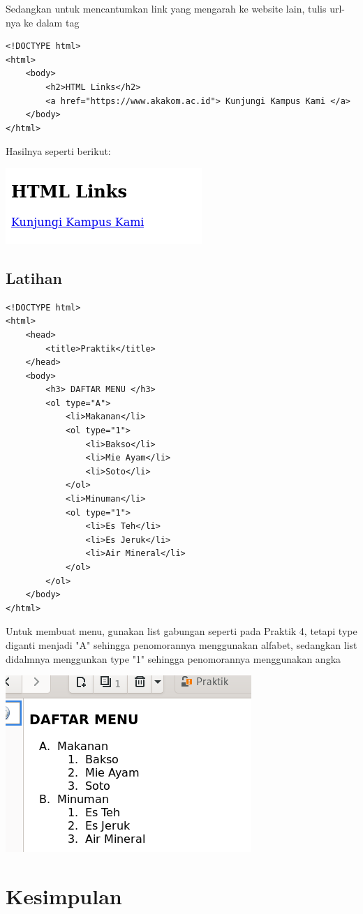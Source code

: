 \documentclass[a4paper,12pt]{article}
\begin{document}
Sedangkan untuk mencantumkan link yang mengarah ke website lain, tulis url-nya ke dalam tag
\begin{lstlisting}
<!DOCTYPE html>
<html>
    <body>
        <h2>HTML Links</h2>
        <a href="https://www.akakom.ac.id"> Kunjungi Kampus Kami </a>
    </body>
</html>
\end{lstlisting}
Hasilnya seperti berikut:
\begin{center}
    \includegraphics[width=\linewidth]{7.png}
\end{center}

\subsection{Latihan}
\begin{lstlisting}
<!DOCTYPE html>
<html>
    <head>
        <title>Praktik</title>
    </head>
    <body>
        <h3> DAFTAR MENU </h3>
        <ol type="A">
            <li>Makanan</li>
            <ol type="1">
                <li>Bakso</li>
                <li>Mie Ayam</li>
                <li>Soto</li>
            </ol>
            <li>Minuman</li>
            <ol type="1">
                <li>Es Teh</li>
                <li>Es Jeruk</li>
                <li>Air Mineral</li>
            </ol>
        </ol>
    </body>
</html>
\end{lstlisting}
Untuk membuat menu, gunakan list gabungan seperti pada Praktik 4, tetapi type diganti menjadi "A" sehingga penomorannya menggunakan alfabet, sedangkan list didalmnya menggunkan 
type "1" sehingga penomorannya menggunakan angka
\begin{center}
    \includegraphics[width=\linewidth]{8.png}
\end{center}

\section{Kesimpulan}
\end{document}
